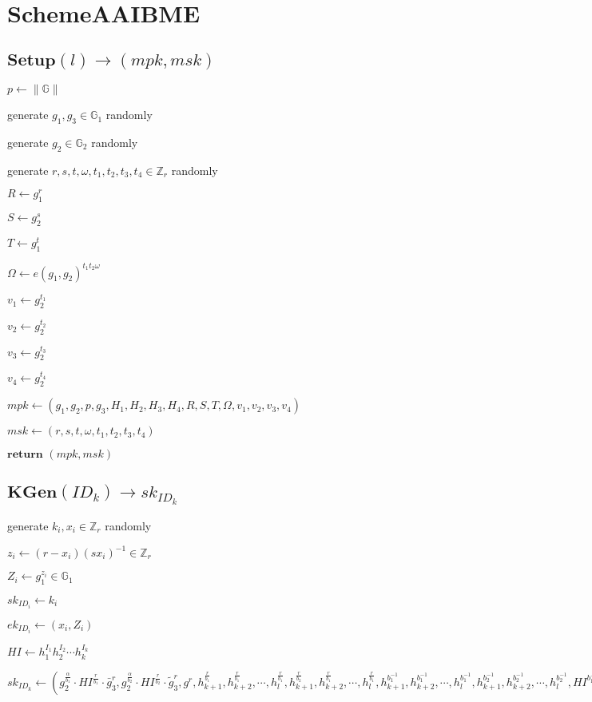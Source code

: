 \documentclass[a4paper]{article}
\begin{document}
\section{SchemeAAIBME}

\subsection{$\textbf{Setup}(l) \rightarrow (\textit{mpk}, \textit{msk})$}

$p \gets \|\mathbb{G}\|$

generate $g_1, g_3 \in \mathbb{G}_1$ randomly

generate $g_2 \in \mathbb{G}_2$ randomly

generate $r, s, t, \omega, t_1, t_2, t_3, t_4 \in \mathbb{Z}_r$ randomly

$R \gets g_1^r$

$S \gets g_2^s$

$T \gets g_1^t$

$\Omega \gets e(g_1, g_2)^{t_1 t_2 \omega}$

$v_1 \gets g_2^{t_1}$

$v_2 \gets g_2^{t_2}$

$v_3 \gets g_2^{t_3}$

$v_4 \gets g_2^{t_4}$

$ \textit{mpk} \gets (g_1, g_2, p, g_3, H_1, H_2, H_3, H_4, R, S, T, \Omega, v_1, v_2, v_3, v_4)$

$\textit{msk} \gets (r, s, t, \omega, t_1, t_2, t_3, t_4)$

$\textbf{return }(\textit{mpk}, \textit{msk})$

\subsection{$\textbf{KGen}(\textit{ID}_k) \rightarrow \textit{sk}_{\textit{ID}_k}$}

generate $k_i, x_i \in \mathbb{Z}_r$ randomly

$z_i \gets (r - x_i)(s x_i)^{-1} \in \mathbb{Z}_r$

$Z_i \gets g_1^{z_i} \in \mathbb{G}_1$

$\textit{sk}_{\textit{ID}_i} \gets k_i$

$\textit{ek}_{\textit{ID}_i} \gets (x_i, Z_i)$

$\textit{HI} \gets h_1^{I_1}h_2^{I_2}\cdots h_k^{I_k}$

$\textit{sk}_{\textit{ID}_k} \gets (
g_2^{\frac{\alpha}{b_1}} \cdot \textit{HI}^{\frac{r}{b_1}} \cdot \bar{g}_3^r, 
g_2^{\frac{\alpha}{b_2}} \cdot \textit{HI}^{\frac{r}{b_2}} \cdot \tilde{g}_3^r, 
g^r, 
h_{k + 1}^{\frac{r}{b_1}}, h_{k + 2}^{\frac{r}{b_1}}, \cdots, h_l^{\frac{r}{b_1}}, 
h_{k + 1}^{\frac{r}{b_2}}, h_{k + 2}^{\frac{r}{b_1}}, \cdots, h_l^{\frac{r}{b_1}}, 
h_{k + 1}^{b_1^{-1}}, h_{k + 2}^{b_1^{-1}}, \cdots, h_l^{b_1^{-1}}, 
h_{k + 1}^{b_2^{-1}}, h_{k + 2}^{b_2^{-1}}, \cdots, h_l^{b_2^{-1}}, 
\textit{HI}^{b_1^{-1}}, \textit{HI}^{b_2^{-1}}
)$
\end{document}
